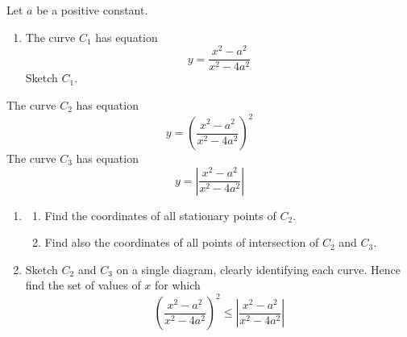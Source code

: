 \documentclass[leqno]{article}
\begin{document}
\begin{enumerate}[
  label=\textbf{\arabic*.},
  leftmargin=*,
  topsep=0pt,
  partopsep=0pt,
  parsep=0pt
]
Let $a$ be a positive constant. \\
\begin{enumerate}[label=\textbf{(\alph*)}]
  \item The curve $C_1$ has equation
  \[
  y=\frac{x^2-a^2}{x^2-4a^2}
  \]
  Sketch $C_1$.  \\
  \end{enumerate}
  The curve $C_2$ has equation
  \[
  y=\left(\frac{x^2-a^2}{x^2-4a^2}\right)^2
  \]
  The curve $C_3$ has equation
  \[
  y=\left|\frac{x^2-a^2}{x^2-4a^2}\right|
  \]
  \begin{enumerate}[label=\textbf{(\alph*)}, resume]
  \item
  \begin{enumerate}[label=(\roman*)]
    \item Find the coordinates of all stationary points of $C_2$. 
    \item Find also the coordinates of all points of intersection of $C_2$ and $C_3$.  \\
  \end{enumerate}
  \item Sketch $C_2$ and $C_3$ on a single diagram, clearly identifying each curve. Hence find the set of values of $x$ for which
  \[
  \left(\frac{x^2-a^2}{x^2-4a^2}\right)^2 \leq \left|\frac{x^2-a^2}{x^2-4a^2}\right|
  \]
\end{enumerate}
\end{enumerate}
\end{document}
